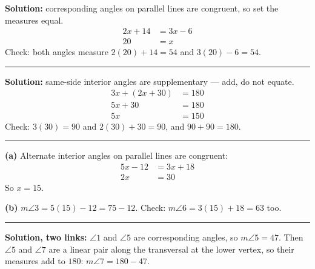 \documentclass[12pt]{article}
\begin{document}



\textbf{Solution:} corresponding angles on parallel lines are congruent, so set the measures equal.
\begin{align*}
  2x + 14 &= 3x - 6 \\
  20 &= x
\end{align*}
Check: both angles measure $2(20) + 14 = 54$ and $3(20) - 6 = 54$. 

\vspace{0.2cm}\noindent\rule{\linewidth}{0.2pt}


\textbf{Solution:} same-side interior angles are supplementary --- add, do not equate.
\begin{align*}
  3x + (2x + 30) &= 180 \\
  5x + 30 &= 180 \\
  5x &= 150
\end{align*}
Check: $3(30) = 90$ and $2(30) + 30 = 90$, and $90 + 90 = 180$. 

\vspace{0.2cm}\noindent\rule{\linewidth}{0.2pt}


\textbf{(a)} Alternate interior angles on parallel lines are congruent:
\begin{align*}
  5x - 12 &= 3x + 18 \\
  2x &= 30
\end{align*}
So $x = 15$. 

\textbf{(b)} $m\angle 3 = 5(15) - 12 = 75 - 12$. Check: $m\angle 6 = 3(15) + 18 = 63$ too. 

\vspace{0.2cm}\noindent\rule{\linewidth}{0.2pt}


\textbf{Solution, two links:} $\angle 1$ and $\angle 5$ are corresponding angles, so $m\angle 5 = 47$. Then $\angle 5$ and $\angle 7$ are a linear pair along the transversal at the lower vertex, so their measures add to $180$: $m\angle 7 = 180 - 47$. 
\end{document}

